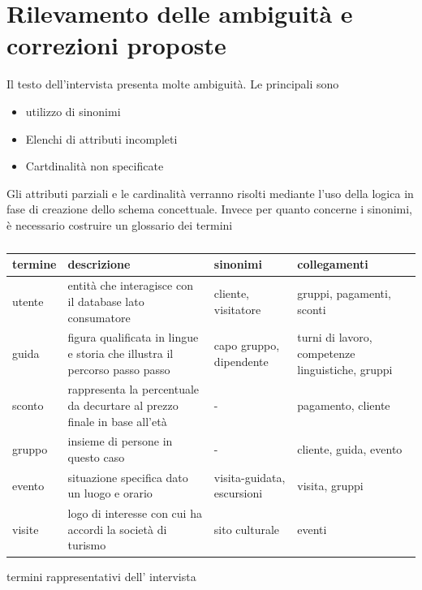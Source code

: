 \documentclass[a4paper,12pt]{report}
\begin{document}
\section{Rilevamento delle ambiguità e correzioni proposte}
Il testo dell'intervista presenta molte ambiguità. Le principali sono
\begin{itemize}
	\item utilizzo di sinonimi
	\item Elenchi di attributi incompleti
	\item Cartdinalità non specificate
\end{itemize}

Gli attributi parziali e le cardinalità verranno risolti mediante l'uso della logica in fase di creazione dello schema concettuale.
Invece per quanto concerne i sinonimi, è necessario costruire un glossario dei termini


\begin{table}[H]
	\begin{center}
		\begin{tabularx}{\textwidth}{|>{\centering\arraybackslash}X|>{\centering\arraybackslash}X|>{\centering\arraybackslash}X|>{\centering\arraybackslash}X|}
			\hline
			\rowcolor{red} termine & descrizione                                                                & sinonimi                   & collegamenti                                     \\
			\hline
			utente                 & entità che interagisce con il database lato consumatore                    & cliente, visitatore        & gruppi, pagamenti, sconti                        \\
			\hline
			guida                  & figura qualificata in lingue e storia che illustra il percorso passo passo & capo gruppo, dipendente    & turni di lavoro, competenze linguistiche, gruppi \\
			\hline
			sconto                 & rappresenta la percentuale da decurtare al prezzo finale in base all'età   & -                          & pagamento, cliente                               \\
			\hline
			gruppo                 & insieme di persone in questo caso                                          & -                          & cliente, guida, evento                           \\
			\hline
			evento                 & situazione specifica dato un luogo e orario                                & visita-guidata, escursioni & visita, gruppi                                   \\
			\hline
			visite                 & logo di interesse con cui ha accordi la società di turismo                 & sito culturale             & eventi                                           \\
			\hline
		\end{tabularx}
		\caption{\label{glossario:termini}} termini rappresentativi dell' intervista
	\end{center}
\end{table}
\end{document}
